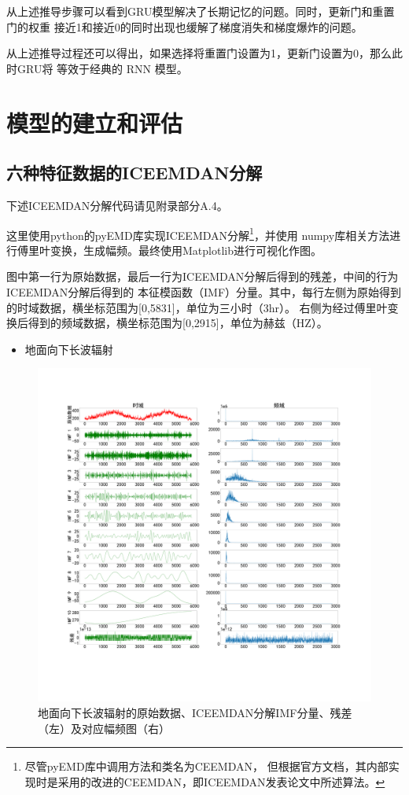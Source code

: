 \documentclass[AutoFakeBold]{LZUThesis}
\begin{document}
从上述推导步骤可以看到GRU模型解决了长期记忆的问题。同时，更新门和重置门的权重
接近1和接近0的同时出现也缓解了梯度消失和梯度爆炸的问题。

从上述推导过程还可以得出，如果选择将重置门设置为1，更新门设置为0，那么此时GRU将
等效于经典的 RNN 模型。

\chapter{模型的建立和评估}
\section{六种特征数据的ICEEMDAN分解}
下述ICEEMDAN分解代码请见附录部分A.4。

这里使用python的pyEMD库实现ICEEMDAN分解\footnote{尽管pyEMD库中调用方法和类名为CEEMDAN，
但根据官方文档，其内部实现时是采用的改进的CEEMDAN，即ICEEMDAN发表论文中所述算法。}，并使用
numpy库相关方法进行傅里叶变换，生成幅频。最终使用Matplotlib进行可视化作图。

图中第一行为原始数据，最后一行为ICEEMDAN分解后得到的残差，中间的行为ICEEMDAN分解后得到的
本征模函数（IMF）分量。其中，每行左侧为原始得到的时域数据，横坐标范围为[0,5831]，单位为三小时（3hr）。
右侧为经过傅里叶变换后得到的频域数据，横坐标范围为[0,2915]，单位为赫兹（HZ）。

\begin{itemize}
    \item[1. ] 地面向下长波辐射
\end{itemize}

\begin{figure}[H]
	\centering
    \includegraphics[width=1\textwidth]{figures/lrad.pdf}
    \caption{地面向下长波辐射的原始数据、ICEEMDAN分解IMF分量、残差（左）及对应幅频图（右）}
    \label{fig_lrad}
\end{figure}
\end{document}
